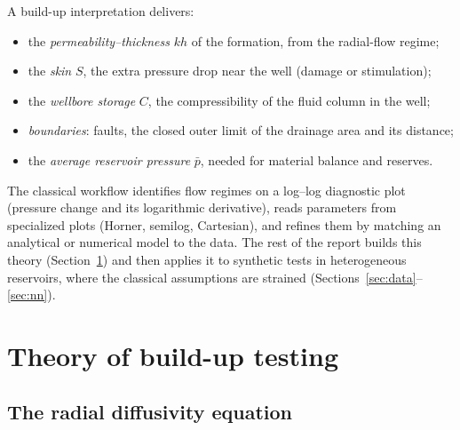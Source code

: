 \documentclass[11pt]{article}
\newcommand{\pb}{\bar p}
\begin{document}
A build-up interpretation delivers:
\begin{itemize}
  \item the \emph{permeability--thickness} $kh$ of the formation, from the radial-flow regime;
  \item the \emph{skin} $S$, the extra pressure drop near the well (damage or stimulation);
  \item the \emph{wellbore storage} $C$, the compressibility of the fluid column in the well;
  \item \emph{boundaries}: faults, the closed outer limit of the drainage area and its distance;
  \item the \emph{average reservoir pressure} $\pb$, needed for material balance and reserves.
\end{itemize}
The classical workflow identifies flow regimes on a log--log diagnostic plot (pressure change and its logarithmic
derivative), reads parameters from specialized plots (Horner, semilog, Cartesian), and refines them by matching an
analytical or numerical model to the data. The rest of the report builds this theory
(Section~\ref{sec:theory}) and then applies it to synthetic tests in heterogeneous reservoirs, where the classical
assumptions are strained (Sections~\ref{sec:data}--\ref{sec:nn}).

\section{Theory of build-up testing}
\label{sec:theory}

\subsection{The radial diffusivity equation}
\end{document}
